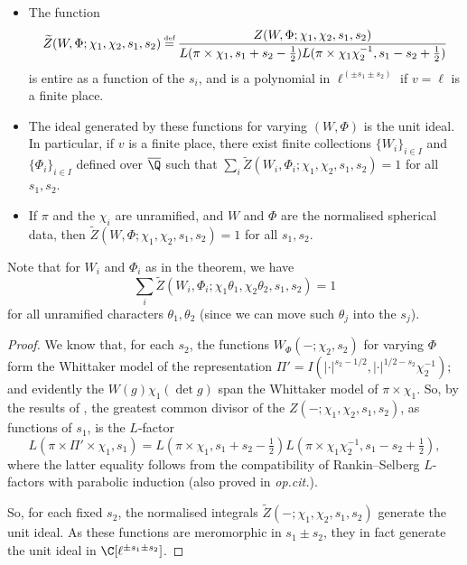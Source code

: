 \documentclass[10pt,reqno,a4paper]{amsart}
\begin{document}
\begin{theorem} \label{thm:jpss}
	\begin{itemize}
\item[(i)] The function
\[
\widetilde{Z}(W, \Phi; \chi_1, \chi_2, s_1, s_2) \defeq \frac{Z(W, \Phi; \chi_1, \chi_2, s_1, s_2)}{L(\pi \times \chi_1, s_1 + s_2 - \tfrac{1}{2}) L(\pi \times \chi_1 \chi_2^{-1}, s_1 - s_2 + \tfrac{1}{2})}
\]
is entire as a function of the $s_i$, and is a polynomial in $\ell^{(\pm s_1 \pm s_2)}$ if $v = \ell$ is a finite place. 

\item[(ii)] The ideal generated by these functions for varying $(W, \Phi)$ is the unit ideal. In particular, if $v$ is a finite place, there exist finite collections $\{W_i\}_{i\in I}$ and $\{\Phi_i\}_{i\in I}$ defined over $\overline{\Q}$ such that $\sum_i\widetilde{Z}(W_i,\Phi_i; \chi_1,\chi_2,s_1,s_2) = 1$ for all $s_1,s_2$. 

\item[(iii)]If $\pi$ and the $\chi_i$ are unramified, and $W$ and $\Phi$ are the normalised spherical data, then $\widetilde{Z}(W,\Phi; \chi_1,\chi_2,s_1,s_2) = 1$ for all $s_1,s_2$.
\end{itemize}
\end{theorem}

Note that for $W_i$ and $\Phi_i$ as in the theorem, we have \[
\sum_i \widetilde{Z}(W_i,\Phi_i;\chi_1\theta_1,\chi_2\theta_2,s_1,s_2) = 1
\]
for all unramified characters $\theta_1,\theta_2$ (since we can move such $\theta_j$ into the $s_j$).


\begin{proof}
We know that, for each $s_2$, the functions $W_{\Phi}(-; \chi_2, s_2)$ for varying $\Phi$ form the Whittaker model of the representation $\Pi' = I(|\cdot|^{s_2 - 1/2}, |\cdot|^{1/2 - s_2} \chi_2^{-1})$; and evidently the $W(g)\chi_1(\det g)$ span the Whittaker model of $\pi \times \chi_1$. So, by the results of \cite{JPSS-RankinSelberg}, %
 the greatest common divisor of the $Z(-;\chi_1, \chi_2, s_1, s_2)$, as functions of $s_1$, is the $L$-factor
\[
L(\pi \times \Pi' \times \chi_1, s_1) = L(\pi \times \chi_1, s_1 + s_2 - \tfrac{1}{2}) L(\pi \times \chi_1\chi_2^{-1}, s_1 - s_2 + \tfrac{1}{2}),
\]
where the latter equality follows from the compatibility of Rankin--Selberg $L$-factors with parabolic induction (also proved in \emph{op.cit.}).

So, for each fixed $s_2$, the normalised integrals $\widetilde{Z}(-; \chi_1, \chi_2, s_1, s_2)$ generate the unit ideal. As these functions are meromorphic in $s_1 \pm s_2$, they in fact generate the unit ideal in $\C[\ell^{\pm s_1 \pm s_2}]$.
\end{proof}
\end{document}
